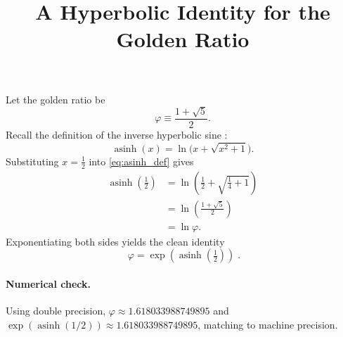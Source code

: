 \documentclass[11pt]{article}
\title{A Hyperbolic Identity for the Golden Ratio}
\author{}
\date{}
\begin{document}
\maketitle

Let the golden ratio be
\begin{equation}
  \varphi \equiv \frac{1+\sqrt{5}}{2}.
\end{equation}
Recall the definition of the inverse hyperbolic sine \cite{NISTDLMF}:
\begin{equation}
  \operatorname{asinh}(x) = \ln\!\Big(x + \sqrt{x^2 + 1}\Big).
  \label{eq:asinh_def}
\end{equation}
Substituting $x=\tfrac{1}{2}$ into \eqref{eq:asinh_def} gives
\begin{align}
  \operatorname{asinh}\!\left(\tfrac{1}{2}\right)
  &= \ln\!\left(\tfrac{1}{2} + \sqrt{\tfrac{1}{4} + 1}\right) \\
  &= \ln\!\left(\tfrac{1 + \sqrt{5}}{2}\right) \\
  &= \ln \varphi.
\end{align}
Exponentiating both sides yields the clean identity
\begin{equation}
  \boxed{\;\varphi = \exp\!\left(\operatorname{asinh}\!\left(\tfrac{1}{2}\right)\right)\; }.
\end{equation}

\paragraph{Numerical check.}
Using double precision,
\(
  \varphi \approx 1.618033988749895
\)
and
\(
  \exp(\operatorname{asinh}(1/2)) \approx 1.618033988749895
\),
matching to machine precision.



\end{document}

